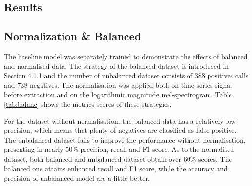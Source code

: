 \subsection{Results}
\subsection*{Normalization \& Balanced}
The baseline model was separately trained to demonstrate the effects of balanced and normalised data. The strategy of the balanced dataset is introduced in Section 4.1.1 and the number of unbalanced dataset consists of 388 positives calls and 738 negatives. The normalisation was applied both on time-series signal before extraction and on the logarithmic magnitude mel-spectrogram. Table \ref{tab:balanc} shows the metrics scores of these strategies.\par
\begin{table}[htp]
    \centering
    \caption{Scores of balanced and unbalanced dataset with/without normalization}
    \label{tab:balanc}
\end{table}
For the dataset without normalisation, the balanced data has a relatively low precision, which means that plenty of negatives are classified as false positive. The unbalanced dataset fails to improve the performance without normalisation, presenting in nearly 50\% precision, recall and F1 score. As to the normalised dataset, both balanced and unbalanced dataset obtain over 60\% scores. The balanced one attains enhanced recall and F1 score, while the accuracy and precision of unbalanced model are a little better.

